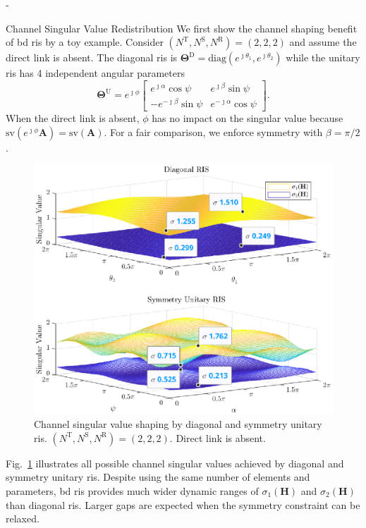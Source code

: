 \documentclass[journal]{IEEEtran}
\begin{document}
\begin{section}{-}
	\begin{subsection}{Channel Singular Value Redistribution}
		We first show the channel shaping benefit of \gls{bd} \gls{ris} by a toy example.
		Consider $(N^\mathrm{T}, N^\mathrm{S}, N^\mathrm{R}) = (2, 2, 2)$ and assume the direct link is absent.
		The diagonal \gls{ris} is $\mathbf{\Theta}^\mathrm{D} = \mathrm{diag}(e^{\jmath \theta_1}, e^{\jmath \theta_2})$ while the unitary \gls{ris} has 4 independent angular parameters
		\begin{equation}
			\mathbf{\Theta}^\mathrm{U} = e^{\jmath \phi} \begin{bmatrix}
				e^{\jmath \alpha} \cos \psi  & e^{\jmath \beta} \sin \psi   \\
				-e^{-\jmath \beta} \sin \psi & e^{-\jmath \alpha} \cos \psi
			\end{bmatrix}.
		\end{equation}
		When the direct link is absent, $\phi$ has no impact on the singular value because $\mathrm{sv}(e^{\jmath \phi} \mathbf{A}) = \mathrm{sv}(\mathbf{A})$.
		For a fair comparison, we enforce symmetry with $\beta = \pi / 2$.
		\begin{figure}
			\centering
			\includegraphics[width=\columnwidth]{assets/simulation/pc_singular_toy.eps}
			\caption{Channel singular value shaping by diagonal and symmetry unitary \gls{ris}. $(N^\mathrm{T}, N^\mathrm{S}, N^\mathrm{R}) = (2, 2, 2)$. Direct link is absent.}
			\label{sm:pc_singular_toy}
		\end{figure}
		Fig.~\ref{sm:pc_singular_toy} illustrates all possible channel singular values achieved by diagonal and symmetry unitary \gls{ris}.
		Despite using the same number of elements and parameters, \gls{bd} \gls{ris} provides much wider dynamic ranges of $\sigma_1(\mathbf{H})$ and $\sigma_2(\mathbf{H})$ than diagonal \gls{ris}.
		Larger gaps are expected when the symmetry constraint can be relaxed.


\end{subsection}
\end{section}
\end{document}
